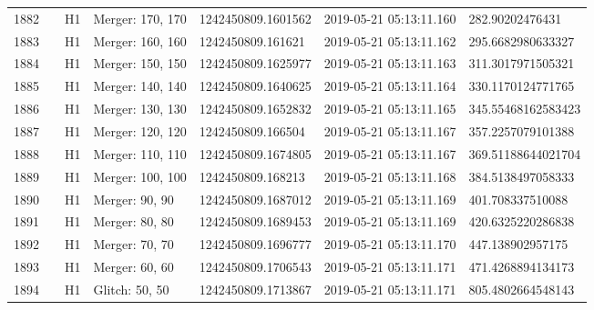 \begin{longtable}{lllllll}
1882 &                                                    &       H1 &  Merger: 170, 170 &  1242450809.1601562 &  2019-05-21 05:13:11.160 &     282.90202476431 \\
1883 &                                                    &       H1 &  Merger: 160, 160 &   1242450809.161621 &  2019-05-21 05:13:11.162 &   295.6682980633327 \\
1884 &                                                    &       H1 &  Merger: 150, 150 &  1242450809.1625977 &  2019-05-21 05:13:11.163 &   311.3017971505321 \\
1885 &                                                    &       H1 &  Merger: 140, 140 &  1242450809.1640625 &  2019-05-21 05:13:11.164 &   330.1170124771765 \\
1886 &                                                    &       H1 &  Merger: 130, 130 &  1242450809.1652832 &  2019-05-21 05:13:11.165 &  345.55468162583423 \\
1887 &                                                    &       H1 &  Merger: 120, 120 &   1242450809.166504 &  2019-05-21 05:13:11.167 &   357.2257079101388 \\
1888 &                                                    &       H1 &  Merger: 110, 110 &  1242450809.1674805 &  2019-05-21 05:13:11.167 &  369.51188644021704 \\
1889 &                                                    &       H1 &  Merger: 100, 100 &   1242450809.168213 &  2019-05-21 05:13:11.168 &   384.5138497058333 \\
1890 &                                                    &       H1 &    Merger: 90, 90 &  1242450809.1687012 &  2019-05-21 05:13:11.169 &    401.708337510088 \\
1891 &                                                    &       H1 &    Merger: 80, 80 &  1242450809.1689453 &  2019-05-21 05:13:11.169 &   420.6325220286838 \\
1892 &                                                    &       H1 &    Merger: 70, 70 &  1242450809.1696777 &  2019-05-21 05:13:11.170 &    447.138902957175 \\
1893 &                                                    &       H1 &    Merger: 60, 60 &  1242450809.1706543 &  2019-05-21 05:13:11.171 &   471.4268894134173 \\
1894 &                                                    &       H1 &    Glitch: 50, 50 &  1242450809.1713867 &  2019-05-21 05:13:11.171 &   805.4802664548143 \\

\end{longtable}
